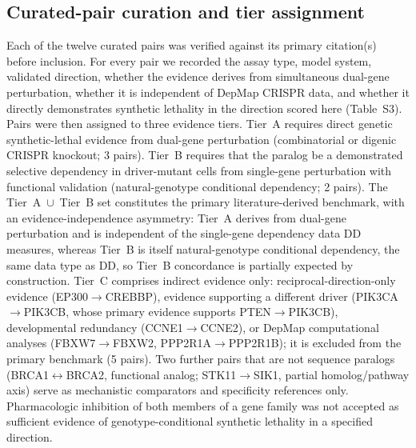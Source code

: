 \documentclass[11pt,a4paper]{article}
\begin{document}
\subsection{Curated-pair curation and tier assignment}
Each of the twelve curated pairs was verified against its primary citation(s) before inclusion. For every pair we recorded the assay type, model system, validated direction, whether the evidence derives from simultaneous dual-gene perturbation, whether it is independent of DepMap CRISPR data, and whether it directly demonstrates synthetic lethality in the direction scored here (Table~S3). Pairs were then assigned to three evidence tiers. Tier~A requires direct genetic synthetic-lethal evidence from dual-gene perturbation (combinatorial or digenic CRISPR knockout; 3 pairs). Tier~B requires that the paralog be a demonstrated selective dependency in driver-mutant cells from single-gene perturbation with functional validation (natural-genotype conditional dependency; 2 pairs). The Tier~A~$\cup$~Tier~B set constitutes the primary literature-derived benchmark, with an evidence-independence asymmetry: Tier~A derives from dual-gene perturbation and is independent of the single-gene dependency data DD measures, whereas Tier~B is itself natural-genotype conditional dependency, the same data type as DD, so Tier~B concordance is partially expected by construction. Tier~C comprises indirect evidence only: reciprocal-direction-only evidence (EP300$\rightarrow$CREBBP), evidence supporting a different driver (PIK3CA$\rightarrow$PIK3CB, whose primary evidence supports PTEN$\rightarrow$PIK3CB), developmental redundancy (CCNE1$\rightarrow$CCNE2), or DepMap computational analyses (FBXW7$\rightarrow$FBXW2, PPP2R1A$\rightarrow$PPP2R1B); it is excluded from the primary benchmark (5 pairs). Two further pairs that are not sequence paralogs (BRCA1$\leftrightarrow$BRCA2, functional analog; STK11$\rightarrow$SIK1, partial homolog/pathway axis) serve as mechanistic comparators and specificity references only. Pharmacologic inhibition of both members of a gene family was not accepted as sufficient evidence of genotype-conditional synthetic lethality in a specified direction.
\end{document}
